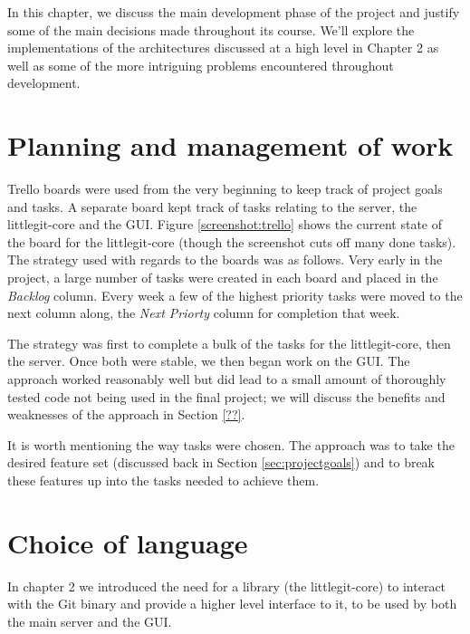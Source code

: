 In this chapter, we discuss the main development phase of the project and justify some of the main decisions made throughout its course. We'll explore the implementations of the architectures discussed at a high level in Chapter 2 as well as some of the more intriguing problems encountered throughout development.


\section{Planning and management of work}

Trello boards were used from the very beginning to keep track of project goals and tasks. A separate board kept track of tasks relating to the server, the littlegit-core and the GUI. Figure \ref{screenshot:trello} shows the current state of the board for the littlegit-core (though the screenshot cuts off many done tasks). The strategy used with regards to the boards was as follows. Very early in the project, a large number of tasks were created in each board and placed in the \emph{Backlog} column. Every week a few of the highest priority tasks were moved to the next column along, the \emph{Next Priorty} column for completion that week. 


The strategy was first to complete a bulk of the tasks for the littlegit-core, then the server. Once both were stable, we then began work on the GUI. The approach worked reasonably well but did lead to a small amount of thoroughly tested code not being used in the final project; we will discuss the benefits and weaknesses of the approach in Section \ref{??}.

It is worth mentioning the way tasks were chosen. The approach was to take the desired feature set (discussed back in Section \ref{sec:projectgoals}) and to break these features up into the tasks needed to achieve them. 

\section{Choice of language}

In chapter 2 we introduced the need for a library (the littlegit-core) to interact with the Git binary and provide a higher level interface to it, to be used by both the main server and the GUI. 

